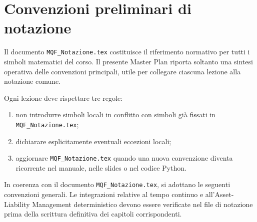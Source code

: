 \documentclass[12pt,a4paper]{article}%
\newcommand{\1}{\mathbf{1}}
\begin{document}
\section{Convenzioni preliminari di notazione}

Il documento \texttt{MQF\_Notazione.tex} costituisce il riferimento normativo
per tutti i simboli matematici del corso. Il presente Master Plan riporta
soltanto una sintesi operativa delle convenzioni principali, utile per
collegare ciascuna lezione alla notazione comune.

Ogni lezione deve rispettare tre regole:

\begin{enumerate}
\item non introdurre simboli locali in conflitto con simboli gi\`{a} fissati
in \texttt{MQF\_Notazione.tex};

\item dichiarare esplicitamente eventuali eccezioni locali;

\item aggiornare \texttt{MQF\_Notazione.tex} quando una nuova convenzione
diventa ricorrente nel manuale, nelle slides o nel codice Python.
\end{enumerate}

In coerenza con il documento \texttt{MQF\_Notazione.tex}, si adottano le
seguenti convenzioni generali. Le integrazioni relative al tempo continuo e
all'Asset-Liability Management deterministico devono essere verificate nel
file di notazione prima della scrittura definitiva dei capitoli
corrispondenti.
\end{document}
